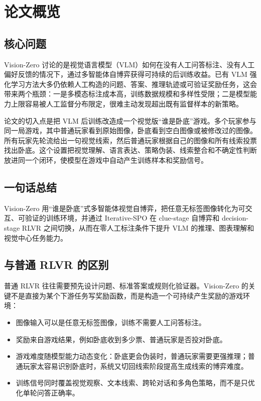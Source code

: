 \section{论文概览}

\subsection{核心问题}

Vision-Zero 讨论的是视觉语言模型（VLM）如何在没有人工问答标注、没有人工偏好反馈的情况下，通过多智能体自博弈获得可持续的后训练收益\cite{visionzero}。已有 VLM 强化学习方法大多仍依赖人工构造的问题、答案、推理轨迹或可验证奖励任务，这会带来两个瓶颈：一是多模态标注成本高，训练数据规模和多样性受限；二是模型能力上限容易被人工监督分布限定，很难主动发现超出既有监督样本的新策略。

论文的切入点是把 VLM 后训练改造成一个视觉版“谁是卧底”游戏。多个玩家参与同一局游戏，其中普通玩家看到原始图像，卧底看到空白图像或被修改过的图像。所有玩家先轮流给出一句视觉线索，然后普通玩家根据自己的图像和所有线索投票找出卧底。这个设置把视觉理解、语言表达、策略伪装、线索整合和不确定性判断放进同一个闭环，使模型在游戏中自动产生训练样本和奖励信号。

\subsection{一句话总结}

Vision-Zero 用“谁是卧底”式多智能体视觉自博弈，把任意无标签图像转化为可交互、可验证的训练环境，并通过 Iterative-SPO 在 clue-stage 自博弈和 decision-stage RLVR 之间切换，从而在零人工标注条件下提升 VLM 的推理、图表理解和视觉中心任务能力。

\subsection{与普通 RLVR 的区别}

普通 RLVR 往往需要预先设计问题、标准答案或规则化验证器。Vision-Zero 的关键不是直接为某个下游任务写奖励函数，而是构造一个可持续产生奖励的游戏环境：

\begin{itemize}
    \item 图像输入可以是任意无标签图像，训练不需要人工问答标注。
    \item 奖励来自游戏结果，例如卧底收到多少票、普通玩家是否投对卧底。
    \item 游戏难度随模型能力动态变化：卧底更会伪装时，普通玩家需要更强推理；普通玩家太容易识别卧底时，系统又切回线索阶段提高生成线索的博弈难度。
    \item 训练信号同时覆盖视觉观察、文本线索、跨轮对话和多角色策略，而不是只优化单轮问答正确率。
\end{itemize}

